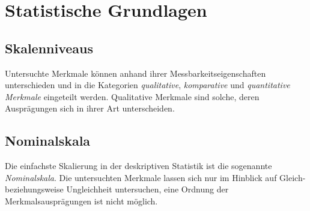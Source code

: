 \documentclass[fontsize=11pt]{scrartcl}
\begin{document}




        \section{Statistische Grundlagen}
            
            \subsection{Skalenniveaus}
                Untersuchte Merkmale können anhand ihrer Messbarkeitseigenschaften unterschieden und in die Kategorien \emph{qualitative}, \emph{komparative} und \emph{quantitative Merkmale} eingeteilt werden.
                Qualitative Merkmale sind solche, deren Ausprägungen sich in ihrer Art unterscheiden. 
                \cite{kohn2005}
            \subsection{Nominalskala}
                Die einfachste Skalierung in der deskriptiven Statistik ist die sogenannte \emph{Nominalskala}. Die untersuchten Merkmale lassen sich nur im Hinblick auf Gleich- beziehungsweise Ungleichheit untersuchen, eine Ordnung der Merkmalsausprägungen ist nicht möglich. 
                \cite{kohn2005}
\end{document}
